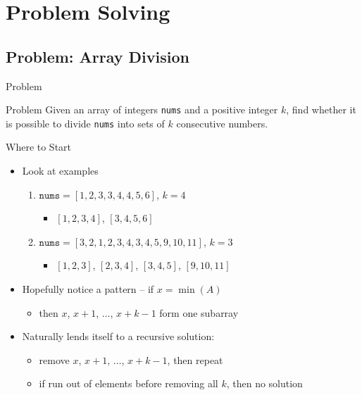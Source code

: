 \section{Problem Solving}
\subsection{Problem: Array Division}
\begin{frame}{Problem}
    \pause
    \begin{block}{Problem}
        Given an array of integers \texttt{nums} and a positive integer $k$, find whether it is possible to divide \texttt{nums} into sets of  $k$ consecutive numbers.
    \end{block}
\end{frame}

\begin{frame}{Where to Start}
    \pause
    \begin{itemize}[<+->]
        \item Look at examples
              \begin{enumerate}[<+->]
                  \item $\texttt{nums} = [1,2,3,3,4,4,5,6]$, $k = 4$
                        \begin{itemize}[<+->]
                            \item $[1, 2, 3, 4]$, $[3, 4, 5, 6]$
                        \end{itemize}
                  \item $\texttt{nums} = [3,2,1,2,3,4,3,4,5,9,10,11]$, $k = 3$
                        \begin{itemize}[<+->]
                            \item $[1, 2, 3]$, $[2, 3, 4]$, $[3, 4, 5]$, $[9, 10, 11]$
                        \end{itemize}
              \end{enumerate}
        \item Hopefully notice a pattern -- if $x = \min(A)$
              \begin{itemize}[<+->]
                  \item then $x$, $x+1$, $\dots$, $x+k-1$ form one subarray
              \end{itemize}
        \item Naturally lends itself to a recursive solution:
              \begin{itemize}[<+->]
                  \item remove $x$, $x+1$, $\dots$, $x+k-1$, then repeat
                  \item if run out of elements before removing all $k$, then no solution
              \end{itemize}
    \end{itemize}
\end{frame}

